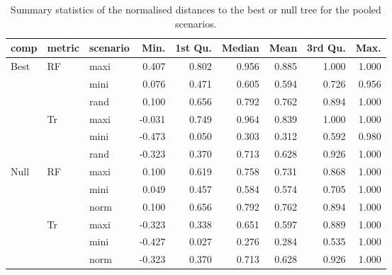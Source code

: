 \begin{table}[ht]
\centering
\begin{tabular}{lllrrrrrr}
  \hline
comp & metric & scenario & Min. & 1st Qu. & Median & Mean & 3rd Qu. & Max. \\ 
  \hline
Best & RF & maxi & 0.407 & 0.802 & 0.956 & 0.885 & 1.000 & 1.000 \\ 
   &  & mini & 0.076 & 0.471 & 0.605 & 0.594 & 0.726 & 0.956 \\ 
   &  & rand & 0.100 & 0.656 & 0.792 & 0.762 & 0.894 & 1.000 \\ 
   & Tr & maxi & -0.031 & 0.749 & 0.964 & 0.839 & 1.000 & 1.000 \\ 
   &  & mini & -0.473 & 0.050 & 0.303 & 0.312 & 0.592 & 0.980 \\ 
   &  & rand & -0.323 & 0.370 & 0.713 & 0.628 & 0.926 & 1.000 \\ 
  Null & RF & maxi & 0.100 & 0.619 & 0.758 & 0.731 & 0.868 & 1.000 \\ 
   &  & mini & 0.049 & 0.457 & 0.584 & 0.574 & 0.705 & 1.000 \\ 
   &  & norm & 0.100 & 0.656 & 0.792 & 0.762 & 0.894 & 1.000 \\ 
   & Tr & maxi & -0.323 & 0.338 & 0.651 & 0.597 & 0.889 & 1.000 \\ 
   &  & mini & -0.427 & 0.027 & 0.276 & 0.284 & 0.535 & 1.000 \\ 
   &  & norm & -0.323 & 0.370 & 0.713 & 0.628 & 0.926 & 1.000 \\ 
   \hline
\end{tabular}
\caption{Summary statistics of the normalised distances to the best or null tree for the pooled scenarios.} 
\label{Full_Tab_pooledscenarios}
\end{table}
